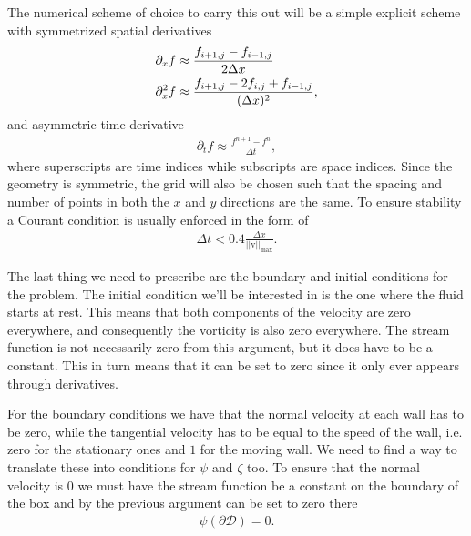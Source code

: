 \documentclass[10pt,a4paper,twocolumn]{article}
\renewcommand{\vec}[1]{\bm{\mathrm{#1}}}
\begin{document}
The numerical scheme of choice to carry this out will be a simple explicit scheme with symmetrized spatial derivatives
%
\begin{align}
    \partial_x f &\approx \frac{f_{i+1,j} - f_{i-1,j}}{2 \Delta x}\notag\\
    \partial_x^2 f &\approx \frac{f_{i+1,j} - 2 f_{i,j} + f_{i-1,j}}{(\Delta x)^2},
\end{align}
%
and asymmetric time derivative
%
\begin{align}
    \partial_t f \approx \frac{f^{n+1} - f^{n}}{\Delta t},
\end{align}
%
where superscripts are time indices while subscripts are space indices. Since the geometry is symmetric, the grid will also be chosen such that the spacing and number of points in both the $x$ and $y$ directions are the same. To ensure stability a Courant condition is usually enforced in the form of
%
\begin{align}
    \Delta t < 0.4 \frac{\Delta x}{||\vec{v}||_{\mathrm{max}}}.
\end{align}

The last thing we need to prescribe are the boundary and initial conditions for the problem. The initial condition we'll be interested in is the one where the fluid starts at rest. This means that both components of the velocity are zero everywhere, and consequently the vorticity is also zero everywhere. The stream function is not necessarily zero from this argument, but it does have to be a constant. This in turn means that it can be set to zero since it only ever appears through derivatives.

For the boundary conditions we have that the normal velocity at each wall has to be zero, while the tangential velocity has to be equal to the speed of the wall, i.e. zero for the stationary ones and $1$ for the moving wall. We need to find a way to translate these into conditions for $\psi$ and $\zeta$ too. To ensure that the normal velocity is $0$ we must have the stream function be a constant on the boundary of the box and by the previous argument can be set to zero there
%
\begin{align}
    \psi({\partial\mathcal{D}}) = 0.
\end{align}
\end{document}
